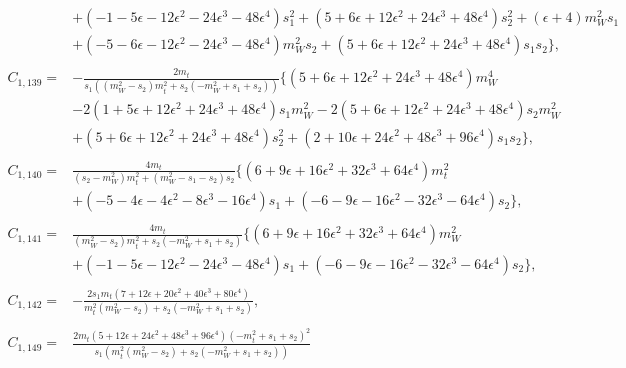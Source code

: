 \documentclass[twocolumn,aps,showpacs,nofootinbib,superscriptaddress,prd]{revtex4-2}
\begin{document}
\begin{widetext}
\begin{align}
\nonumber\\&
+\left(-1 -5 \epsilon -12 \epsilon^2 -24 \epsilon^3 -48 \epsilon^4\right)s_1^2+\left(5 +6 \epsilon +12 \epsilon^2 +24 \epsilon^3 +48 \epsilon^4\right)s_2^2+(\epsilon+4)m_W^2s_1
\nonumber\\&
+\left(-5 -6 \epsilon -12 \epsilon^2 -24 \epsilon^3 -48 \epsilon^4\right)m_W^2s_2+\left(5 +6 \epsilon +12 \epsilon^2 +24 \epsilon^3 +48 \epsilon^4\right)s_1s_2\}
,\nonumber\\
\nonumber\\
C_{1,139}=&-\frac{2m_t}{s_1\left(\left(m_W^2-s_2\right)m_t^2+s_2\left(-m_W^2+s_1+s_2\right)\right)}\{\left(5 +6 \epsilon +12 \epsilon^2 +24 \epsilon^3 +48 \epsilon^4\right)m_W^4
\nonumber\\&
-2\left(1 +5 \epsilon +12 \epsilon^2 +24 \epsilon^3 +48 \epsilon^4\right)s_1m_W^2-2\left(5 +6 \epsilon +12 \epsilon^2 +24 \epsilon^3 +48 \epsilon^4\right)s_2m_W^2
\nonumber\\&
+\left(5 +6 \epsilon +12 \epsilon^2 +24 \epsilon^3 +48 \epsilon^4\right)s_2^2+\left(2 +10 \epsilon +24 \epsilon^2 +48 \epsilon^3 +96 \epsilon^4\right)s_1s_2\}
,\nonumber\\
\nonumber\\
C_{1,140}=&\frac{4m_t}{\left(s_2-m_W^2\right)m_t^2+\left(m_W^2-s_1-s_2\right)s_2}\{\left(6 +9 \epsilon +16 \epsilon^2 +32 \epsilon^3 +64 \epsilon^4\right)m_t^2
\nonumber\\&
+\left(-5 -4 \epsilon -4 \epsilon^2 -8 \epsilon^3 -16 \epsilon^4\right)s_1+\left(-6 -9 \epsilon -16 \epsilon^2 -32 \epsilon^3 -64 \epsilon^4\right)s_2\}
,\nonumber\\
\nonumber\\
C_{1,141}=&\frac{4m_t}{\left(m_W^2-s_2\right)m_t^2+s_2\left(-m_W^2+s_1+s_2\right)}\{\left(6 +9 \epsilon +16 \epsilon^2 +32 \epsilon^3 +64 \epsilon^4\right)m_W^2
\nonumber\\&
+\left(-1 -5 \epsilon -12 \epsilon^2 -24 \epsilon^3 -48 \epsilon^4\right)s_1+\left(-6 -9 \epsilon -16 \epsilon^2 -32 \epsilon^3 -64 \epsilon^4\right)s_2\}
,\nonumber\\
\nonumber\\
C_{1,142}=&-\frac{2s_1m_t\left(7 +12 \epsilon +20 \epsilon^2 +40 \epsilon^3 +80 \epsilon^4\right)}{m_t^2\left(m_W^2-s_2\right)+s_2
\left(-m_W^2+s_1+s_2\right)}
,\nonumber\\
\nonumber\\
C_{1,149}=&\frac{2m_t\left(5 +12 \epsilon +24 \epsilon^2 +48 \epsilon^3 +96 \epsilon^4\right)\left(-m_t^2+s_1+s_2\right)^2}{s_1
\left(m_t^2\left(m_W^2-s_2\right)+s_2\left(-m_W^2+s_1+s_2\right)\right)}

\end{align}
\end{widetext}
\end{document}
